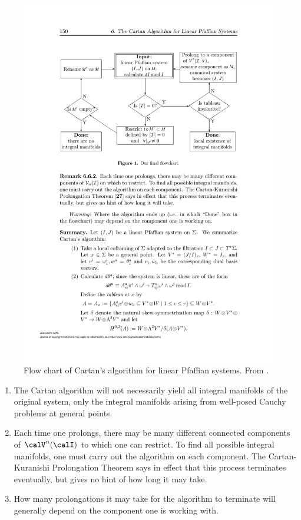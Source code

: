 \begin{figure}[tp]
    \centering
    \includegraphics[scale=0.7]{figures/algorithm.pdf}
    \caption{Flow chart of Cartan's algorithm for linear Pfaffian systems. From \cite{Ivey}.}
    \label{fig cartan algorithm}
\end{figure}


\begin{rem}
    \begin{enumerate}
        \item The Cartan algorithm will not necessarily yield all integral manifolds of the original system, only the integral manifolds arising from well-posed Cauchy problems at general points.
        \item Each time one prolongs, there may be many different connected components of $\calV^n(\calI)$ to which one can restrict. To find all possible integral manifolds, one must carry out the algorithm on each component. The Cartan-Kuranishi Prolongation Theorem says in effect that this process terminates eventually, but gives no hint of how long it may take.
        \item How many prolongations it may take for the algorithm to terminate will generally depend on the component one is working with.
    \end{enumerate}
\end{rem}







